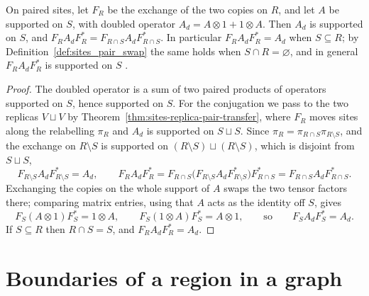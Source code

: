 \begin{theorem}
    \label{thm:sites-replica-swap-doubled}
    \leanok
    On paired sites, let $F_R$ be the exchange of the two copies on $R$, and let $A$ be
    supported on $S$, with doubled operator $A_d=A\otimes1+1\otimes A$. Then $A_d$ is
    supported on $S$, and $F_RA_dF_R^*=F_{R\cap S}A_dF_{R\cap S}^*$. In particular
    $F_RA_dF_R^*=A_d$ when $S\subseteq R$; by Definition~\ref{def:sites_pair_swap} the
    same holds when $S\cap R=\varnothing$, and in general $F_RA_dF_R^*$ is supported on
    $S$ \cite[Section~2]{OpenAI2026PolynomialPEPS}.
\end{theorem}
\begin{proof}
    \leanok
    The doubled operator is a sum of two paired products of operators supported on $S$,
    hence supported on $S$. For the conjugation we pass to the two replicas $V\sqcup V$
    by Theorem~\ref{thm:sites-replica-pair-transfer}, where $F_R$ moves sites along the
    relabelling $\pi_R$ and $A_d$ is supported on $S\sqcup S$. Since
    $\pi_R=\pi_{R\cap S}\pi_{R\setminus S}$, and the exchange on $R\setminus S$ is
    supported on $(R\setminus S)\sqcup(R\setminus S)$, which is disjoint from
    $S\sqcup S$,
    \[
        F_{R\setminus S}A_dF_{R\setminus S}^*=A_d,\qquad
        F_RA_dF_R^*=F_{R\cap S}\bigl(F_{R\setminus S}A_dF_{R\setminus S}^*\bigr)
            F_{R\cap S}^*=F_{R\cap S}A_dF_{R\cap S}^* .
    \]
    Exchanging the copies on the whole support of $A$ swaps the two tensor
    factors there; comparing matrix entries, using that $A$ acts as the identity
    off $S$, gives
    \[
        F_S(A\otimes1)F_S^*=1\otimes A,\qquad F_S(1\otimes A)F_S^*=A\otimes1,
        \qquad\text{so}\qquad F_SA_dF_S^*=A_d .
    \]
    If $S\subseteq R$ then $R\cap S=S$, and $F_RA_dF_R^*=A_d$.
\end{proof}


\section{Boundaries of a region in a graph}
\label{sec:sites_graph_boundary}

